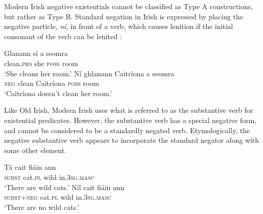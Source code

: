 ﻿\documentclass[output=paper]{langsci/langscibook}
\begin{document}
Modern Irish negative existentials cannot be classified as
Type A constructions, but rather as Type B. Standard negation in
Irish is expressed by placing the negative particle, \textit{ní}, in front of a verb, which causes lenition if the initial consonant of the verb can be lenited \citep[86]{Stenson2008}:
%
\begin{exe}\ex
{}
\begin{xlist}
\ex \gll Glanann sí a seomra \\
clean.\textsc{prs}  she \textsc{poss} room \\
    \glt `She cleans her room.' 
\ex\gll Ní ghlanann Caitríona a seomra\\
\textsc{neg} clean        Caitríona  \textsc{poss} room\\
\glt `Caitríona doesn't clean her room.' 
\end{xlist}\end{exe}
%
Like Old Irish, Modern Irish uses what is referred to as the substantive verb for existential predicates. However, the substantive verb has a special negative form, and cannot be considered to be a standardly negated verb. Etymologically, the negative substantive verb appears to incorporate the standard negator along with some other element. 
%
\begin{exe}\ex
{}
\begin{xlist}
\ex \gll Tá cait fiáin ann \\
    \textsc{subst} cat.\textsc{pl} wild in.\textsc{3sg}.\textsc{masc} \\
    \glt `There are wild cats.'
\ex\gll Níl cait fiáin ann\\
    \textsc{subst}+\textsc{neg} cat.\textsc{pl} wild in.\textsc{3sg.masc}\\
    \glt `There are no wild cats.'
\end{xlist}\end{exe}
\end{document}
